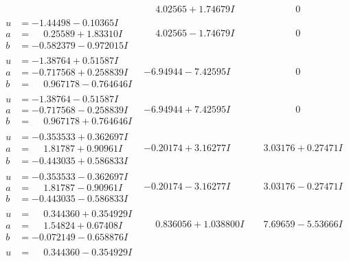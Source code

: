 \documentclass[1p]{elsarticle_modified}
\theoremstyle{definition}
\begin{document}
$$\begin{array}{c|c|c}
 & \phantom{-}4.02565 + 1.74679 I & \phantom{-0.000000 } 0 \\ \hline\begin{aligned}
u &= -1.44498 - 0.10365 I \\
a &= \phantom{-}0.25589 + 1.83310 I \\
b &= -0.582379 - 0.972015 I\end{aligned}
 & \phantom{-}4.02565 - 1.74679 I & \phantom{-0.000000 } 0 \\ \hline\begin{aligned}
u &= -1.38764 + 0.51587 I \\
a &= -0.717568 + 0.258839 I \\
b &= \phantom{-}0.967178 - 0.764646 I\end{aligned}
 & -6.94944 - 7.42595 I & \phantom{-0.000000 } 0 \\ \hline\begin{aligned}
u &= -1.38764 - 0.51587 I \\
a &= -0.717568 - 0.258839 I \\
b &= \phantom{-}0.967178 + 0.764646 I\end{aligned}
 & -6.94944 + 7.42595 I & \phantom{-0.000000 } 0 \\ \hline\begin{aligned}
u &= -0.353533 + 0.362697 I \\
a &= \phantom{-}1.81787 + 0.90961 I \\
b &= -0.443035 + 0.586833 I\end{aligned}
 & -0.20174 + 3.16277 I & \phantom{-}3.03176 + 0.27471 I \\ \hline\begin{aligned}
u &= -0.353533 - 0.362697 I \\
a &= \phantom{-}1.81787 - 0.90961 I \\
b &= -0.443035 - 0.586833 I\end{aligned}
 & -0.20174 - 3.16277 I & \phantom{-}3.03176 - 0.27471 I \\ \hline\begin{aligned}
u &= \phantom{-}0.344360 + 0.354929 I \\
a &= \phantom{-}1.54824 + 0.67408 I \\
b &= -0.072149 - 0.658876 I\end{aligned}
 & \phantom{-}0.836056 + 1.038800 I & \phantom{-}7.69659 - 5.53666 I \\ \hline\begin{aligned}
u &= \phantom{-}0.344360 - 0.354929 I \\

\end{aligned}
\end{array}$$
\end{document}
